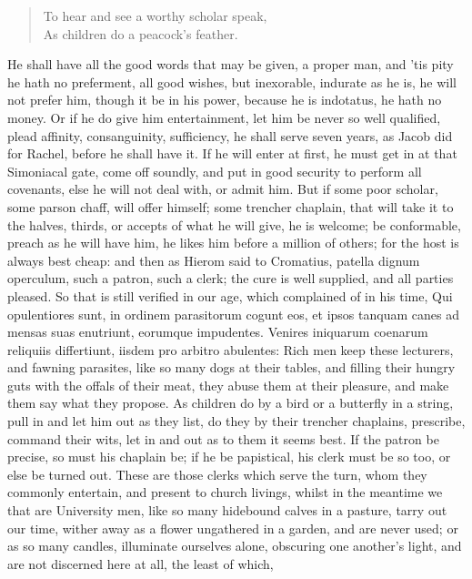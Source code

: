 {{\begin{verse}
To hear and see a worthy scholar speak,\\
As children do a peacock's feather.
\end{verse}

He shall have all the good words that may be given, a proper man,
and 'tis pity he hath no preferment, all good wishes, but inexorable,
indurate as he is, he will not prefer him, though it be in his power,
because he is indotatus, he hath no money. Or if he do give him
entertainment, let him be never so well qualified, plead affinity,
consanguinity, sufficiency, he shall serve seven years, as Jacob did
for Rachel, before he shall have it. If he will enter at first,
he must get in at that Simoniacal gate, come off soundly, and put in
good security to perform all covenants, else he will not deal with, or
admit him. But if some poor scholar, some parson chaff, will offer
himself; some trencher chaplain, that will take it to the halves,
thirds, or accepts of what he will give, he is welcome; be conformable,
preach as he will have him, he likes him before a million of others;
for the host is always best cheap: and then as Hierom said to
Cromatius, patella dignum operculum, such a patron, such a clerk; the
cure is well supplied, and all parties pleased. So that is still
verified in our age, which \Chrysostom{} complained of in his time,
Qui opulentiores sunt, in ordinem parasitorum cogunt eos, et ipsos
tanquam canes ad mensas suas enutriunt, eorumque impudentes. Venires
iniquarum coenarum reliquiis differtiunt, iisdem pro arbitro abulentes:
Rich men keep these lecturers, and fawning parasites, like so many dogs
at their tables, and filling their hungry guts with the offals of their
meat, they abuse them at their pleasure, and make them say what they
propose. As children do by a bird or a butterfly in a string,
pull in and let him out as they list, do they by their trencher
chaplains, prescribe, command their wits, let in and out as to them it
seems best. If the patron be precise, so must his chaplain be; if he be
papistical, his clerk must be so too, or else be turned out. These are
those clerks which serve the turn, whom they commonly entertain, and
present to church livings, whilst in the meantime we that are
University men, like so many hidebound calves in a pasture, tarry out
our time, wither away as a flower ungathered in a garden, and are never
used; or as so many candles, illuminate ourselves alone, obscuring one
another's light, and are not discerned here at all, the least of which,
}}
